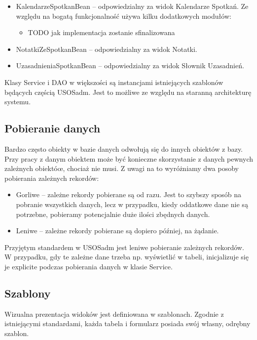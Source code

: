 \documentclass[licencjacka]{pracamgr}
\begin{document}
\begin{itemize}
\item KalendarzeSpotkanBean -- odpowiedzialny za widok Kalendarze Spotkań. Ze względu na bogatą funkcjonalność używa kilku dodatkowych modułów:
\begin{itemize}
\item TODO jak implementacja zostanie sfinalizowana
\end{itemize}
\item NotatkiZeSpotkanBean -- odpowiedzialny za widok Notatki.
\item UzasadnieniaSpotkanBean -- odpowiedzialny za widok Słownik Uzasadnień.
\end{itemize}

Klasy Service i DAO w większości są instancjami istniejących szablonów będących częścią USOSadm. Jest to możliwe ze względu na staranną architekturę systemu.

\subsection{Pobieranie danych}
Bardzo często obiekty w bazie danych odwołują się do innych obiektów z bazy. Przy pracy z danym obiektem może być konieczne skorzystanie z danych pewnych zależnych obiektóœ, chociaż nie musi. Z uwagi na to wyróżniamy dwa posoby pobierania zależnych rekordów:

\begin{itemize}
\item Gorliwe -- zależne rekordy pobierane są od razu. Jest to szybszy sposób na pobranie wszystkich danych, lecz w przypadku, kiedy oddatkowe dane nie są potrzebne, pobieramy potencjalnie duże ilości zbędnych danych.
\item Leniwe -- zależne rekordy pobierane są dopiero później, na żądanie.
\end{itemize}

Przyjętym standardem w USOSadm jest leniwe pobieranie zależnych rekordów. W przypadku, gdy te zależne dane trzeba np. wyświetlić w tabeli, inicjalizuje się je explicite podczas pobierania danych w klasie Service.

\subsection{Szablony}
Wizualna prezentacja widoków jest definiowana w szablonach. Zgodnie z istniejącymi standardami, każda tabela i formularz posiada swój własny, odrębny szablon.
\end{document}

